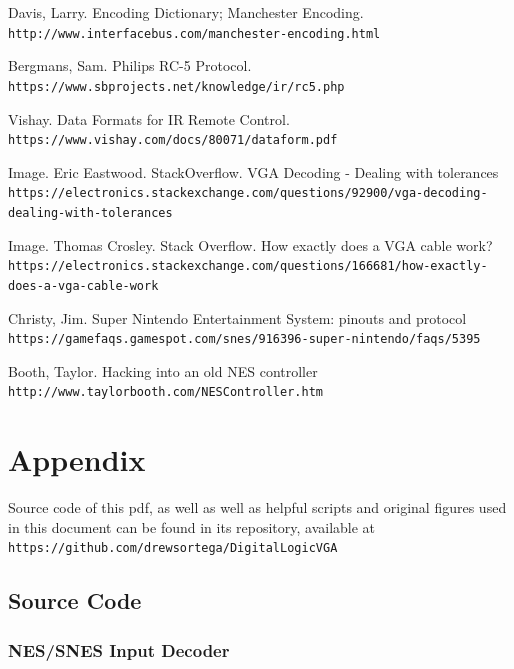 \documentclass[]{article}
\begin{document}
\begin{thebibliography}{99}
    Davis, Larry. Encoding Dictionary; Manchester Encoding.
    \\\texttt{http://www.interfacebus.com/manchester-encoding.html}

    Bergmans, Sam. Philips RC-5 Protocol.
    \\\texttt{https://www.sbprojects.net/knowledge/ir/rc5.php}

    Vishay. Data Formats for IR Remote Control. 
    \\\texttt{https://www.vishay.com/docs/80071/dataform.pdf}
    
    Image. Eric Eastwood. StackOverflow.  VGA Decoding - Dealing with tolerances
    \\\texttt{https://electronics.stackexchange.com/questions/92900/vga-decoding-dealing-with-tolerances}
    
    Image. Thomas Crosley. Stack Overflow.  How exactly does a VGA cable work?
    \\\texttt{https://electronics.stackexchange.com/questions/166681/how-exactly-does-a-vga-cable-work}

    Christy, Jim. Super Nintendo Entertainment System: pinouts and protocol
    \\\texttt{https://gamefaqs.gamespot.com/snes/916396-super-nintendo/faqs/5395}

    Booth, Taylor. Hacking into an old NES controller
    \\\texttt{http://www.taylorbooth.com/NESController.htm}
\end{thebibliography}

\section{Appendix}
Source code of this pdf, as well as well as helpful scripts and original figures used in this document can be found in its repository, available at \\\texttt{https://github.com/drewsortega/DigitalLogicVGA}
\subsection{Source Code}
\subsubsection{NES/SNES Input Decoder}

\end{document}
